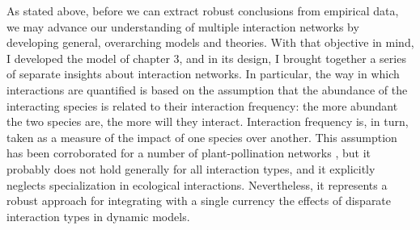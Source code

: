 As stated above, before we can extract robust conclusions from empirical data, we may advance our understanding of multiple interaction networks by developing general, overarching models and theories. With that objective in mind, I developed the model of chapter 3, and in its design, I brought together a series of separate insights about interaction networks. In particular, the way in which interactions are quantified is based on the assumption that the abundance of the interacting species is related to their interaction frequency: the more abundant the two species are, the more will they interact. Interaction frequency is, in turn, taken as a measure of the impact of one species over another. This assumption has been corroborated for a number of plant-pollination networks \citep{Vazquez2005,Vazquez2007,Vazquez2012}, but it probably does not hold generally for all interaction types, and it explicitly neglects specialization in ecological interactions. Nevertheless, it represents a robust approach for integrating with a single currency the effects of disparate interaction types in dynamic models.

